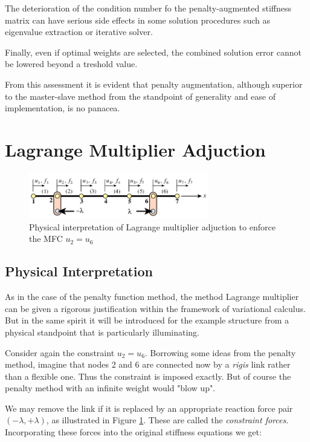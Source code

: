 \documentclass[10pt,b5paper,titlepage]{book}
\begin{document}
The deterioration of the condition number fo the penalty-augmented stiffness
matrix can have serious side effects in some solution procedures such as
eigenvalue extraction or iterative solver.

Finally, even if optimal weights are selected, the combined solution error cannot
be lowered beyond a treshold value.

From this assessment it is evident that penalty augmentation, although superior
to the master-slave method from the standpoint of generality and ease of
implementation, is no panacea.


\section{Lagrange Multiplier Adjuction}

\begin{figure}[ht]
    \centering
    \includegraphics[width=0.70\textwidth]{img/1D_mfc_lagrange_multiplier.png}
    \caption{Physical interpretation of Lagrange multiplier adjuction to enforce
    the MFC $ u_2 = u_6 $}
    \label{fig:1D-MFC-lagrange-multiplier-png}
\end{figure}


\subsection{Physical Interpretation}

As in the case of the penalty function method, the method Lagrange multiplier
can be given a rigorous justification within the framework of variational
calculus. But in the same spirit it will be introduced for the example structure
from a physical standpoint that is particularly illuminating.

Consider again the constraint $ u_2 = u_6 $. Borrowing some ideas from the
penalty method, imagine that nodes 2 and 6 are connected now by
a \textit{rigis} link rather than a flexible one. Thus the constraint is imposed
exactly. But of course the penalty method with an infinite weight would "blow up".

We may remove the link if it is replaced by an appropriate reaction force pair
$ ( -\lambda, +\lambda ) $, as illustrated in Figure
\ref{fig:1D-MFC-lagrange-multiplier-png}. These are called the
\textit{constraint forces}. Incorporating these forces into the original stiffness
equations we get:
\end{document}
